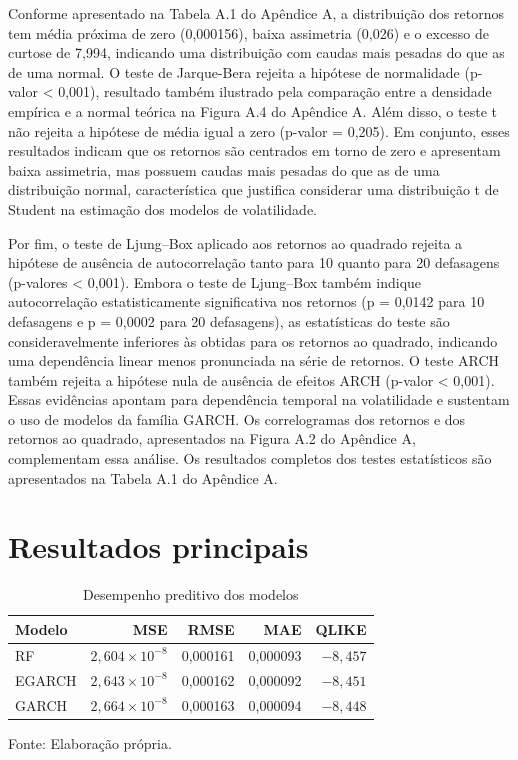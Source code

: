 Conforme apresentado na Tabela A.1 do Apêndice A, a distribuição dos retornos tem média próxima de zero (0,000156), baixa assimetria (0,026) e o excesso de curtose de 7,994, indicando uma distribuição 
com caudas mais pesadas do que as de uma normal. O teste de Jarque-Bera rejeita a hipótese de normalidade (p-valor < 0,001), resultado 
também ilustrado pela comparação entre a densidade empírica e a normal teórica na Figura A.4 do Apêndice A. Além disso, o teste t não rejeita a hipótese 
de média igual a zero (p-valor = 0,205). Em conjunto, esses resultados indicam que os retornos são centrados em torno de zero e apresentam baixa assimetria, mas possuem caudas mais pesadas do que as de 
uma distribuição normal, característica que justifica considerar uma distribuição t de Student na estimação dos modelos de volatilidade.

Por fim, o teste de Ljung–Box aplicado aos retornos ao quadrado rejeita a hipótese de ausência de autocorrelação tanto para 10 quanto para 20 defasagens 
(p-valores < 0,001). Embora o teste de Ljung–Box também indique autocorrelação estatisticamente significativa nos retornos (p = 0,0142 para 10 defasagens e p = 0,0002 para 20 defasagens), 
as estatísticas do teste são consideravelmente inferiores às obtidas para os retornos ao quadrado, indicando uma dependência linear menos pronunciada na série de retornos. O teste ARCH também rejeita a 
hipótese nula de ausência de efeitos ARCH (p-valor < 0,001). Essas evidências apontam para dependência temporal na volatilidade 
e sustentam o uso de modelos da família GARCH. Os correlogramas dos retornos e dos retornos ao quadrado, apresentados na Figura A.2 do Apêndice A, complementam essa análise. 
Os resultados completos dos testes estatísticos são apresentados na Tabela A.1 do Apêndice A.

\section{Resultados principais}

\begin{table}[htbp]
    \centering
    \caption{Desempenho preditivo dos modelos}
    \label{tab:metricas}
    \begin{tabular}{lrrrr}
        \toprule
        Modelo & MSE & RMSE & MAE & QLIKE \\
        \midrule
        RF     & $2{,}604 \times 10^{-8}$ & 0,000161 & 0,000093 & $-8{,}457$ \\
        EGARCH & $2{,}643 \times 10^{-8}$ & 0,000162 & 0,000092 & $-8{,}451$ \\
        GARCH  & $2{,}664 \times 10^{-8}$ & 0,000163 & 0,000094 & $-8{,}448$ \\
        \bottomrule
    \end{tabular}

    \vspace{0.2cm}
    \footnotesize Fonte: Elaboração própria.
\end{table}

